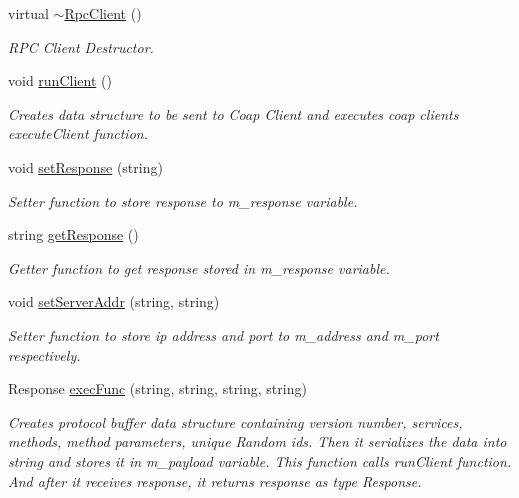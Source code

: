 \begin{DoxyCompactItemize}
\item 
\mbox{\label{classcoappbrpc_1_1RpcClient_a9b90b3ba0fef5ebd90748e454c1c7fd9}} 
virtual \hyperlink{classcoappbrpc_1_1RpcClient_a9b90b3ba0fef5ebd90748e454c1c7fd9}{$\sim$\+Rpc\+Client} ()
\begin{DoxyCompactList}\small\item\em R\+PC Client Destructor. \end{DoxyCompactList}\item 
\mbox{\label{classcoappbrpc_1_1RpcClient_a19f14a9f5ac45332f1656c0ab033dc09}} 
void \hyperlink{classcoappbrpc_1_1RpcClient_a19f14a9f5ac45332f1656c0ab033dc09}{run\+Client} ()
\begin{DoxyCompactList}\small\item\em Creates data structure to be sent to Coap Client and executes coap client\textquotesingle{}s execute\+Client function. \end{DoxyCompactList}\item 
void \hyperlink{classcoappbrpc_1_1RpcClient_a0f08b63838a62377d4470eb2a0259178}{set\+Response} (string)
\begin{DoxyCompactList}\small\item\em Setter function to store response to m\+\_\+response variable. \end{DoxyCompactList}\item 
\mbox{\label{classcoappbrpc_1_1RpcClient_ac79e3b2a76335a214cbe1c6f169d46c2}} 
string \hyperlink{classcoappbrpc_1_1RpcClient_ac79e3b2a76335a214cbe1c6f169d46c2}{get\+Response} ()
\begin{DoxyCompactList}\small\item\em Getter function to get response stored in m\+\_\+response variable. \end{DoxyCompactList}\item 
void \hyperlink{classcoappbrpc_1_1RpcClient_a69755d690a7f2d6373e191d359e48986}{set\+Server\+Addr} (string, string)
\begin{DoxyCompactList}\small\item\em Setter function to store ip address and port to m\+\_\+address and m\+\_\+port respectively. \end{DoxyCompactList}\item 
Response \hyperlink{classcoappbrpc_1_1RpcClient_afe2dc0caa49442db4898379d040c8b64}{exec\+Func} (string, string, string, string)
\begin{DoxyCompactList}\small\item\em Creates protocol buffer data structure containing version number, services, methods, method parameters, unique Random ids. Then it serializes the data into string and stores it in m\+\_\+payload variable. This function calls run\+Client function. And after it receives response, it returns response as type Response. \end{DoxyCompactList}\end{DoxyCompactItemize}
